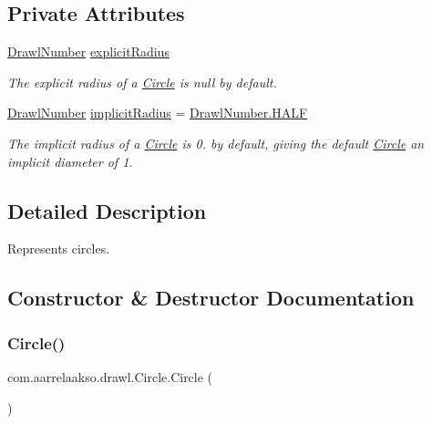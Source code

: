 \subsection*{Private Attributes}
\begin{DoxyCompactItemize}
\item 
\hyperlink{classcom_1_1aarrelaakso_1_1drawl_1_1_drawl_number}{Drawl\+Number} \hyperlink{classcom_1_1aarrelaakso_1_1drawl_1_1_circle_a125baa27e0cf2e667361e0637cd82e7c}{explicit\+Radius}
\begin{DoxyCompactList}\small\item\em The explicit radius of a \hyperlink{classcom_1_1aarrelaakso_1_1drawl_1_1_circle}{Circle} is null by default. \end{DoxyCompactList}\item 
\hyperlink{classcom_1_1aarrelaakso_1_1drawl_1_1_drawl_number}{Drawl\+Number} \hyperlink{classcom_1_1aarrelaakso_1_1drawl_1_1_circle_afb7f13978788e711c490cec96e9f899a}{implicit\+Radius} = \hyperlink{classcom_1_1aarrelaakso_1_1drawl_1_1_drawl_number_ae0980b8dd35b0bb52b87b37700d15322}{Drawl\+Number.\+H\+A\+LF}
\begin{DoxyCompactList}\small\item\em The implicit radius of a \hyperlink{classcom_1_1aarrelaakso_1_1drawl_1_1_circle}{Circle} is 0. by default, giving the default \hyperlink{classcom_1_1aarrelaakso_1_1drawl_1_1_circle}{Circle} an implicit diameter of 1. \end{DoxyCompactList}\end{DoxyCompactItemize}


\subsection{Detailed Description}
Represents circles. 

\subsection{Constructor \& Destructor Documentation}
\mbox{\label{classcom_1_1aarrelaakso_1_1drawl_1_1_circle_a18cd01a953d72d49941bc8211f50d268}} 
\subsubsection{\texorpdfstring{Circle()}{Circle()}\hspace{0.1cm}{\footnotesize\ttfamily [1/2]}}
{\footnotesize\ttfamily com.\+aarrelaakso.\+drawl.\+Circle.\+Circle (\begin{DoxyParamCaption}{ }\end{DoxyParamCaption})}



